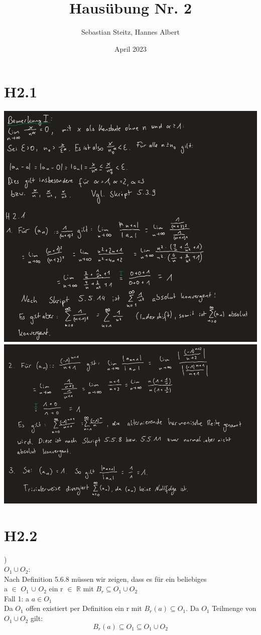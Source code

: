 \documentclass{article}
\title{Hausübung Nr. 2}
\author{Sebastian Steitz, Hannes Albert}
\date{April 2023}
\begin{document}
\maketitle

\section{H2.1}
\includegraphics[scale=0.6]{h2_1_1} \\ 

\bigskip
\includegraphics[scale=0.6]{h2_1_2}

\section{H2.2}
) \\
\setlength\leftskip{1cm}
$O_1 \cup O_2$: \\ 
Nach Definition 5.6.8 müssen wir zeigen, dass es für ein beliebiges \\
a $\in$ $O_1$ $\cup$ $O_2$ ein
r $\in$ $\mathds{R}$ mit $B_r \subseteq O_1 \cup O_2$ \\
Fall 1: a $a \in O_1$ \\ 
Da $O_1$ offen existiert per Definition ein r mit $B_r(a) \subseteq O_1$. Da 
$O_1$ Teilmenge von $O_1 \cup O_2$ gilt: 
\[
    B_r(a) \subseteq O_1 \subseteq O_1 \cup O_2
\]
\end{document}
